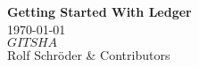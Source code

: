 
\begin{titlepage}
\vspace*{10 mm} %
\begin{center}
{\Huge\bfseries Getting Started With Ledger}\\
\vspace{50mm}
\today \leavevmode \\
$GITSHA$ \\
\vspace{\fill}
Rolf Schr\"oder \& Contributors
\end{center}
\end{titlepage}
